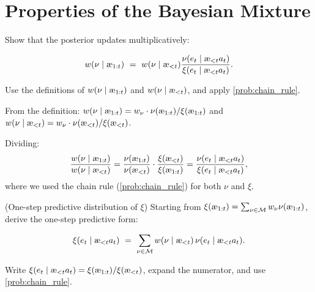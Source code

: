 \documentclass[fontsize=11pt, parskip=half]{scrartcl}
\newcommand{\cM}{\mathcal{M}}
\newcommand{\aes}{\textnormal{\ae}}
\begin{document}
\section{Properties of the Bayesian Mixture}\label{prob:mixture_props}



\begin{exercise}
\label{prob:posterior_update}
\skippable
Show that the posterior updates multiplicatively:

\[
    w(\nu \mid \aes_{1:t}) ~=~ w(\nu \mid \aes_{<t}) \frac{\nu(e_t \mid \aes_{<t} a_t)}{\xi(e_t \mid \aes_{<t} a_t)}.
\]
\begin{hint}
Use the definitions of $w(\nu \mid \aes_{1:t})$ and $w(\nu \mid \aes_{<t})$, and apply \cref{prob:chain_rule}.
\end{hint}
\end{exercise}

\begin{solution}
From the definition: $w(\nu \mid \aes_{1:t}) = w_\nu \cdot \nu(\aes_{1:t})/\xi(\aes_{1:t})$ and $w(\nu \mid \aes_{<t}) = w_\nu \cdot \nu(\aes_{<t})/\xi(\aes_{<t})$.

Dividing:
\[
    \frac{w(\nu \mid \aes_{1:t})}{w(\nu \mid \aes_{<t})}
    = \frac{\nu(\aes_{1:t})}{\nu(\aes_{<t})} \cdot \frac{\xi(\aes_{<t})}{\xi(\aes_{1:t})}
    = \frac{\nu(e_t \mid \aes_{<t} a_t)}{\xi(e_t \mid \aes_{<t} a_t)},
\]
where we used the chain rule (\cref{prob:chain_rule}) for both $\nu$ and $\xi$.
\end{solution}

\begin{exercise}
\label{prob:one_step}
(One-step predictive distribution of $\xi$)
Starting from $\xi(\aes_{1:t}) = \sum_{\nu \in \cM} w_\nu \nu(\aes_{1:t})$, derive the one-step predictive form:

\[
    \xi(e_t \mid \aes_{<t} a_t) ~=~ \sum_{\nu \in \cM} w(\nu \mid \aes_{<t})\, \nu(e_t \mid \aes_{<t} a_t).
\]
\begin{hint}
Write $\xi(e_t \mid \aes_{<t} a_t) = \xi(\aes_{1:t}) / \xi(\aes_{<t})$, expand the numerator, and use \cref{prob:chain_rule}.
\end{hint}
\end{exercise}
\end{document}
